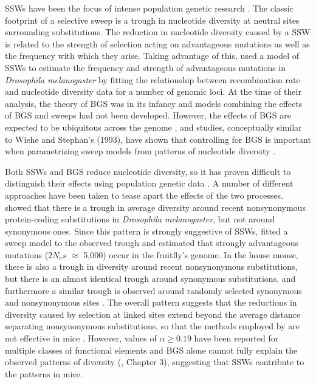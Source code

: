 	SSWs have been the focus of intense population genetic research \citep{RN124, RN226, RN278, RN235}. The classic footprint of a selective sweep is a trough in nucleotide diversity at neutral sites surrounding substitutions. The reduction in nucleotide diversity caused by a SSW is related to the strength of selection acting on advantageous mutations as well as the frequency with which they arise. Taking advantage of this, \cite{RN277} used a model of SSWs to estimate the frequency and strength of advantageous mutations in \textit{Drosophila melanogaster} by fitting the relationship between recombination rate and nucleotide diversity data for a number of genomic loci. At the time of their analysis, the theory of BGS was in its infancy and models combining the effects of BGS and sweeps had not been developed. However, the effects of BGS are expected to be ubiquitous across the genome \citep{RN116, RN274, RN120}, and studies, conceptually similar to Wiehe and Stephan's (1993), have shown that controlling for BGS is important when parametrizing sweep models from patterns of nucleotide diversity \citep{RN290, RN274, RN116}.

	Both SSWs and BGS reduce nucleotide diversity, so it has proven difficult to distinguish their effects using population genetic data \citep{RN339}. A number of different approaches have been taken to tease apart the effects of the two processes. \cite{RN167} showed that there is a trough in average diversity around recent nonsynonymous protein-coding substitutions in \textit{Drosophila melanogaster}, but not around synonymous ones. Since this pattern is strongly suggestive of SSWs, \cite{RN167} fitted a sweep model to the observed trough and estimated that strongly advantageous mutations ($2N_es$ $\approx$ 5,000) occur in the fruitfly's genome.  In the house mouse, there is also a trough in diversity around recent nonsynonymous substitutions, but there is an almost identical trough around synonymous substitutions, and furthermore a similar trough is observed around  randomly selected synonymous and nonsynonymous sites \citep{RN122}. The overall pattern suggests that the reductions in diversity caused by selection at linked sites extend beyond the average distance separating nonsynonymous substitutions, so that the methods employed by \cite{RN167} are not effective in mice \citep{RN122}. However, values of $\alpha \geq 0.19$ have been reported for  multiple classes of functional elements \citep{RN122} and BGS alone cannot fully explain the observed patterns of diversity (\citealt{RN122}, Chapter 3), suggesting that SSWs contribute to the patterns in mice.


